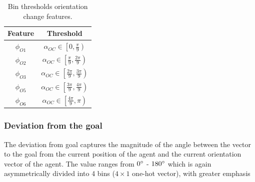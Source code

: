 \begin{table}[htbp]
    \caption{Bin thresholds orientation change features.}
    \label{orientation-change-bins}
    \begin{center}
        \renewcommand{\arraystretch}{1.3}
        \begin{tabular}{|c|c|}
            \hline
            Feature & Threshold \\
            \hline
            $\phi_{O1}$ & $\alpha_{OC} \in \left[ 0 , \frac{\pi}{9} \right)$ \\
            
            $\phi_{O2}$ & $\alpha_{OC} \in \left[ \frac{\pi}{9} , \frac{2\pi}{9} \right)$ \\
            
            $\phi_{O3}$ & $\alpha_{OC} \in \left[ \frac{2\pi}{9} , \frac{3\pi}{9} \right)$ \\
    
            
            $\phi_{O5}$ & $\alpha_{OC} \in \left[ \frac{3\pi}{9} , \frac{4\pi}{9} \right)$ \\
            
            $\phi_{O6}$ & $\alpha_{OC} \in \left[ \frac{4\pi}{9} , \pi \right)$ \\
            \hline
        \end{tabular}
    \end{center}
\end{table}
\subsubsection*{Deviation from the goal}
The deviation from goal captures the magnitude of the angle between the vector to the goal from the current position of the agent and the current orientation vector of the agent. The value ranges from $0 \degree$ - $ 180 \degree$ which is again asymmetrically divided into 4 bins ($4 \times 1$ one-hot vector), with greater emphasis  

